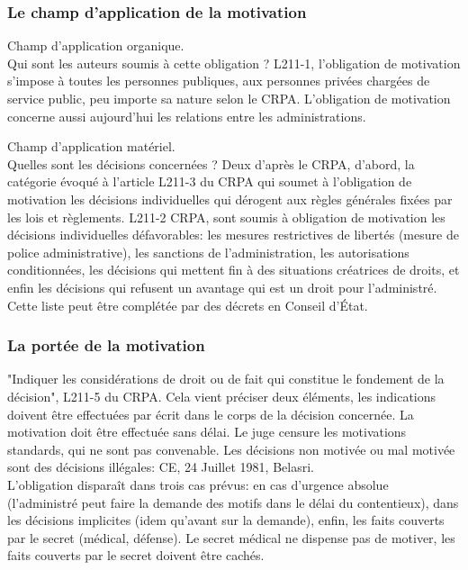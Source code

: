 \documentclass[10pt, a4paper, openany]{book}
\begin{document}
\subsubsection{Le champ d'application de la motivation}

Champ d'application organique. \\
Qui sont les auteurs soumis à cette obligation ? L211-1, l'obligation de motivation s'impose à toutes les personnes publiques, aux personnes privées chargées de service public, peu importe sa nature selon le CRPA. L'obligation de motivation concerne aussi aujourd'hui les relations entre les administrations. 


Champ d'application matériel. \\
Quelles sont les décisions concernées ? Deux d'après le CRPA, d'abord, la catégorie évoqué à l'article L211-3 du CRPA qui soumet à l'obligation de motivation les décisions individuelles qui dérogent aux règles générales fixées par les lois et règlements. L211-2 CRPA, sont soumis à obligation de motivation les décisions individuelles défavorables: les mesures restrictives de libertés (mesure de police administrative), les sanctions de l'administration, les autorisations conditionnées, les décisions qui mettent fin à des situations créatrices de droits, et enfin les décisions qui refusent un avantage qui est un droit pour l'administré. \\
Cette liste peut être complétée par des décrets en Conseil d'État. 

\subsubsection{La portée de la motivation}

"Indiquer les considérations de droit ou de fait qui constitue le fondement de la décision", L211-5 du CRPA. Cela vient préciser deux éléments, les indications doivent être effectuées par écrit dans le corps de la décision concernée. La motivation doit être effectuée sans délai. Le juge censure les motivations standards, qui ne sont pas convenable. Les décisions non motivée ou mal motivée sont des décisions illégales: CE, 24 Juillet 1981, Belasri. \\
L'obligation disparaît dans trois cas prévus: en cas d'urgence absolue (l'administré peut faire la demande des motifs dans le délai du contentieux), dans les décisions implicites (idem qu'avant sur la demande), enfin, les faits couverts par le secret (médical, défense). Le secret médical ne dispense pas de motiver, les faits couverts par le secret doivent être cachés. 
\end{document}
